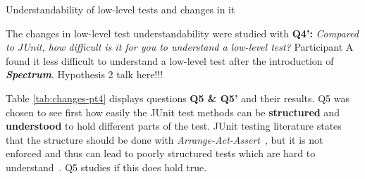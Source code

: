     \begin{table}[H]
            \caption {Understandability of low-level tests and changes in it} \label{tab:changes-pt3}
    \end{table}

The changes in low-level test understandability were studied with \textbf{Q4':} \textit{Compared to JUnit, how difficult is it
for you to understand a low-level test?} Participant A found it less difficult to understand a low-level
test after the introduction of \textbf{\textit{Spectrum}}. Hypothesis 2 talk here!!!

Table \ref{tab:changes-pt4} displays questions \textbf{Q5 \& Q5'} and their results. Q5 was chosen to see first
how easily the JUnit test methods can be \textbf{structured} and \textbf{understood} to hold different parts of the test. JUnit testing literature states that
the structure should be done with \textit{Arrange-Act-Assert}~\cite{langr2015pragmatic}, but it is not enforced and thus can lead to poorly structured
tests which are hard to understand~\cite{kapelonis2016java}. Q5 studies if this does hold true.

